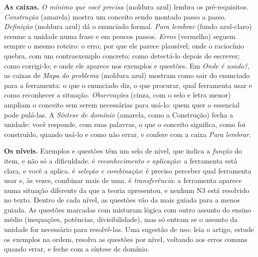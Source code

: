 \textbf{As caixas.} \emph{O mínimo que você precisa} (moldura azul) lembra os pré-requisitos. \emph{Construção} (amarela) mostra um conceito sendo montado passo a passo. \emph{Definição} (moldura azul) dá o enunciado formal. \emph{Para lembrar} (fundo azul-claro) resume a unidade numa frase e em poucos passos. \emph{Erros} (vermelho) seguem sempre o mesmo roteiro: o erro; por que ele parece plausível; onde o raciocínio quebra, com um contraexemplo concreto; como detectá-lo depois de escrever; como corrigi-lo; e onde ele aparece nos exemplos e questões. Em \emph{Onde é usado?}, as caixas de \emph{Mapa do problema} (moldura azul) mostram como sair do enunciado para a ferramenta: o que o enunciado diz, o que procurar, qual ferramenta usar e como reconhecer a situação. \emph{Observações} (cinza, com o selo \opcional{} e letra menor) ampliam o conceito sem serem necessárias para usá-lo: quem quer o essencial pode pulá-las. A \emph{Síntese de domínio} (amarela, como a Construção) fecha a unidade: você responde, com suas palavras, o que o conceito significa, como foi construído, quando usá-lo e como não errar, e confere com a caixa \emph{Para lembrar}.

\textbf{Os níveis.} Exemplos e questões têm um selo de nível, que indica a \emph{função} do item, e não só a dificuldade.  é \emph{reconhecimento e aplicação}: a ferramenta está clara, e você a aplica.  é \emph{seleção e combinação}: é preciso perceber qual ferramenta usar e, às vezes, combinar mais de uma.  é \emph{transferência}: a ferramenta aparece numa situação diferente da que a teoria apresentou, e nenhum N3 está resolvido no texto. Dentro de cada nível, as questões vão da mais guiada para a menos guiada. As questões marcadas com \integradora{} misturam lógica com outro assunto do ensino médio (inequações, potências, divisibilidade), mas só entram se o assunto da unidade for necessário para resolvê-las. Uma sugestão de uso: leia o artigo, estude os exemplos na ordem, resolva as questões por nível, voltando aos erros comuns quando errar, e feche com a síntese de domínio.

